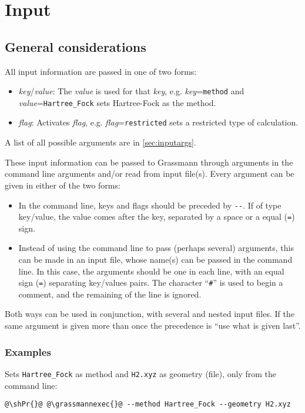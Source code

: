 \hypertarget{chap:input}{}
\chapter{Input}
\label{sec:input}
\chapterauthor{}


\section{General considerations}

All input information are passed in one of two forms:
\begin{itemize}
\item \emph{key}/\emph{value}:
  The \emph{value} is used for that \emph{key},
  e.g. \emph{key}=\verb+method+ and \emph{value}=\verb+Hartree_Fock+ sets Hartree-Fock as the method.
\item \emph{flag}:
  Activates \emph{flag},
  e.g. \emph{flag}=\verb+restricted+ sets a restricted type of calculation.
\end{itemize}
A list of all possible arguments are in \ref{sec:inputargs}.

These input information can be passed to Grassmann through arguments in the command line arguments
and/or read from input file(s). Every argument can be given in either of the two forms:
\begin{itemize}
\item In the command line, keys and flags should be preceded by \verb+--+.
  If of type key/value, the value comes after the key, separated by a space or a equal (\verb+=+) sign.
\item Instead of using the command line to pass (perhaps several) arguments, this can be made
  in an input file, whose name(s) can be passed in the command line.
  In this case, the arguments should be one in each line, with an equal sign (\verb+=+) separating
  key/values pairs.
  The character ``\verb+#+'' is used to begin a comment, and the remaining of the line is ignored.
\end{itemize}
Both ways can be used in conjunction, with several and nested input files.
If the same argument is given more than once the precedence is ``use what is given last''.

\subsection{Examples}

Sets \verb+Hartree_Fock+ as method and \verb+H2.xyz+ as geometry (file), only from the command line:
\begin{lstlisting}[style=shstyint]
@\shPr{}@ @\grassmannexec{}@ --method Hartree_Fock --geometry H2.xyz
\end{lstlisting}

